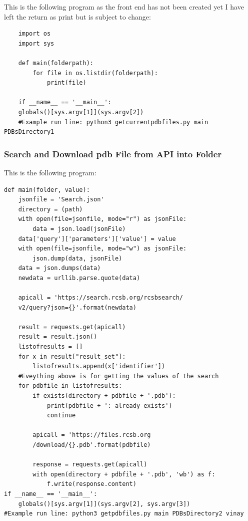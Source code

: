 \documentclass[]{final_report}
\begin{document}
This is the following program as the front end has not been created yet I have left the return as print but is subject to change:

\begin{lstlisting}
    import os
    import sys

    def main(folderpath):
        for file in os.listdir(folderpath):
            print(file)

    if __name__ == '__main__':
    globals()[sys.argv[1]](sys.argv[2])
    #Example run line: python3 getcurrentpdbfiles.py main PDBsDirectory1

\end{lstlisting}

\subsubsection{Search and Download pdb File from API into Folder}

This is the following program:

\begin{lstlisting}
def main(folder, value):
    jsonfile = 'Search.json'
    directory = (path)
    with open(file=jsonfile, mode="r") as jsonFile:
        data = json.load(jsonFile)
    data['query']['parameters']['value'] = value
    with open(file=jsonfile, mode="w") as jsonFile:
        json.dump(data, jsonFile)
    data = json.dumps(data)
    newdata = urllib.parse.quote(data)

    apicall = 'https://search.rcsb.org/rcsbsearch/
    v2/query?json={}'.format(newdata)

    result = requests.get(apicall)
    result = result.json()
    listofresults = []
    for x in result["result_set"]:
        listofresults.append(x['identifier'])
    #Eveything above is for getting the values of the search
    for pdbfile in listofresults:
        if exists(directory + pdbfile + '.pdb'):
            print(pdbfile + ': already exists')
            continue

        apicall = 'https://files.rcsb.org
        /download/{}.pdb'.format(pdbfile)

        response = requests.get(apicall)
        with open(directory + pdbfile + '.pdb', 'wb') as f:
            f.write(response.content)
if __name__ == '__main__':
    globals()[sys.argv[1]](sys.argv[2], sys.argv[3])
#Example run line: python3 getpdbfiles.py main PDBsDirectory2 vinay
\end{lstlisting}
\end{document}
